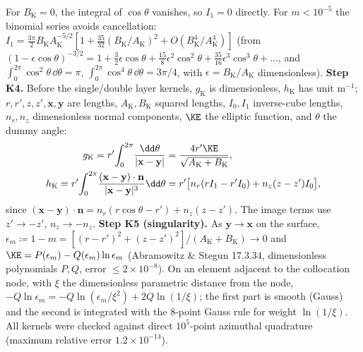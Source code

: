 For $B_{\mathrm K}=0$, the integral of $\cos\theta$ vanishes, so $I_1=0$ directly.
For $m<10^{-5}$ the binomial series avoids cancellation:
$I_1=\tfrac{3\pi}{2}B_{\mathrm K}A_{\mathrm K}^{-5/2}
[1+\tfrac{35}{32}(B_{\mathrm K}/A_{\mathrm K})^2+O(B_{\mathrm K}^4/A_{\mathrm K}^4)]$ (from
$(1-\epsilon\cos\theta)^{-3/2}=1+\tfrac32\epsilon\cos\theta+\tfrac{15}{8}\epsilon^2\cos^2\theta+\tfrac{35}{16}\epsilon^3\cos^3\theta+\dots$,
and $\int_0^{2\pi}\cos^2\theta\,\dd\theta=\pi$,
$\int_0^{2\pi}\cos^4\theta\,\dd\theta=3\pi/4$, with
$\epsilon=B_{\mathrm K}/A_{\mathrm K}$ dimensionless).
\textbf{Step K4.} Before the single/double layer kernels, $g_{\mathrm K}$ is dimensionless,
$h_{\mathrm K}$ has unit m$^{-1}$; $r,r',z,z',\mathbf x,\mathbf y$ are lengths,
$A_{\mathrm K},B_{\mathrm K}$ squared lengths, $I_0,I_1$ inverse-cube lengths,
$n_r,n_z$ dimensionless normal components, $\KE$ the elliptic function, and $\theta$ the dummy angle:
\begin{align}
g_{\mathrm K}=r'\!\int_0^{2\pi}\!\frac{\dd\theta}{|\mathbf x-\mathbf y|}
&=\frac{4r'\KE}{\sqrt{A_{\mathrm K}+B_{\mathrm K}}},\notag\\
h_{\mathrm K}=r'\!\int_0^{2\pi}\!\frac{(\mathbf x-\mathbf y)\cdot\mathbf n}{|\mathbf x-\mathbf y|^3}\dd\theta
&=r'\bigl[n_r(rI_1-r'I_0)+n_z(z-z')I_0\bigr],\label{eq:K4}
\end{align}
since $(\mathbf x-\mathbf y)\cdot\mathbf n=n_r(r\cos\theta-r')+n_z(z-z')$. The image terms use $z'\to-z'$, $n_z\to-n_z$.
\textbf{Step K5 (singularity).} As $\mathbf y\to\mathbf x$ on the surface,
$\epsilon_m\coloneqq1-m=[(r-r')^2+(z-z')^2]/(A_{\mathrm K}+B_{\mathrm K})\to0$ and
$\KE=P(\epsilon_m)-Q(\epsilon_m)\ln\epsilon_m$ (Abramowitz \& Stegun 17.3.34,
dimensionless polynomials $P,Q$, error $\le2\times10^{-8}$). On an element
adjacent to the collocation node, with $\xi$ the dimensionless parametric distance from the node,
$-Q\ln\epsilon_m=-Q\ln(\epsilon_m/\xi^2)+2Q\ln(1/\xi)$; the first part is smooth (Gauss) and the second is integrated with the
8-point Gauss rule for weight $\ln(1/\xi)$. All kernels were checked against direct $10^5$-point azimuthal quadrature
(maximum relative error $1.2\times10^{-14}$).

